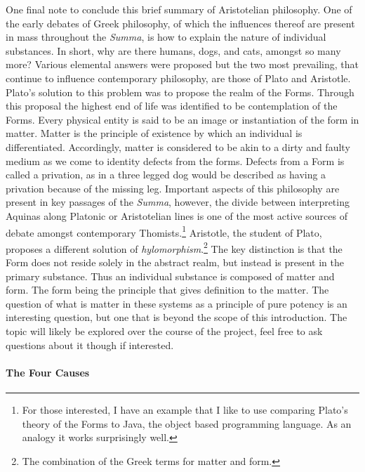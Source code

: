 \documentclass{ucetd}
\begin{document}
One final note to conclude this brief summary of Aristotelian philosophy. One of the early debates of Greek philosophy, of which the influences thereof are present in mass throughout the \textit{Summa}, is how to explain the nature of individual substances. In short, why are there humans, dogs, and cats, amongst so many more? Various elemental answers were proposed but the two most prevailing, that continue to influence contemporary philosophy, are those of Plato and Aristotle. Plato’s solution to this problem was to propose the realm of the Forms. Through this proposal the highest end of life was identified to be contemplation of the Forms. Every physical entity is said to be an image or instantiation of the form in matter. Matter is the principle of existence by which an individual is differentiated. Accordingly, matter is considered to be akin to a dirty and faulty medium as we come to identity defects from the forms. Defects from a Form is called a privation, as in a three legged dog would be described as having a privation because of the missing leg. Important aspects of this philosophy are present in key passages of the \textit{Summa}, however, the divide between interpreting Aquinas along Platonic or Aristotelian lines is one of the most active sources of debate amongst contemporary Thomists.\footnote{For those interested, I have an example that I like to use comparing Plato’s theory of the Forms to Java, the object based programming language. As an analogy it works surprisingly well.} Aristotle, the student of Plato, proposes a different solution of \textit{hylomorphism}.\footnote{The combination of the Greek terms for matter and form.} The key distinction is that the Form does not reside solely in the abstract realm, but instead is present in the primary substance. Thus an individual substance is composed of matter and form. The form being the principle that gives definition to the matter. The question of what is matter in these systems as a principle of pure potency is an interesting question, but one that is beyond the scope of this introduction. The topic will likely be explored over the course of the project, feel free to ask questions about it though if interested.

\paragraph{The Four Causes}
\end{document}
